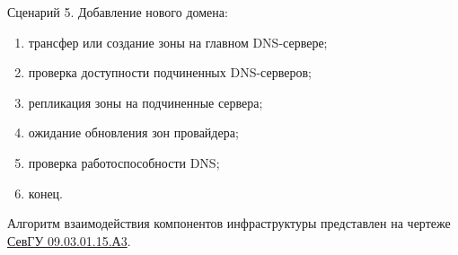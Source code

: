 Сценарий 5. Добавление нового домена:
\begin{enumerate}
  \item трансфер или создание зоны на главном DNS-сервере;
  \item проверка доступности подчиненных DNS-серверов;
  \item репликация зоны на подчиненные сервера;
  \item ожидание обновления зон провайдера;
  \item проверка работоспособности DNS;
  \item конец.
\end{enumerate}

Алгоритм взаимодействия компонентов инфраструктуры представлен на чертеже \href{extra/drafts/SevGU_09.03.01.15.A3.pdf}{СевГУ 09.03.01.15.А3}.

\clearpage
